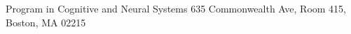 \address{Boston University}{Program in Cognitive and Neural Systems}%
    {635 Commonwealth Ave, Room 415, Boston, MA 02215}
